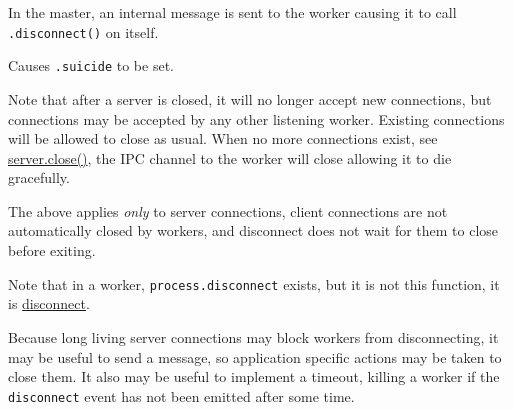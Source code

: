 In the master, an internal message is sent to the worker causing it to
call \texttt{.disconnect()} on itself.

Causes \texttt{.suicide} to be set.

Note that after a server is closed, it will no longer accept new
connections, but connections may be accepted by any other listening
worker. Existing connections will be allowed to close as usual. When no
more connections exist, see
\href{net.html\#net_event_close}{server.close()}, the IPC channel to the
worker will close allowing it to die gracefully.

The above applies \emph{only} to server connections, client connections
are not automatically closed by workers, and disconnect does not wait
for them to close before exiting.

Note that in a worker, \texttt{process.disconnect} exists, but it is not
this function, it is
\href{child_process.html\#child_process_child_disconnect}{disconnect}.

Because long living server connections may block workers from
disconnecting, it may be useful to send a message, so application
specific actions may be taken to close them. It also may be useful to
implement a timeout, killing a worker if the \texttt{disconnect} event
has not been emitted after some time.

